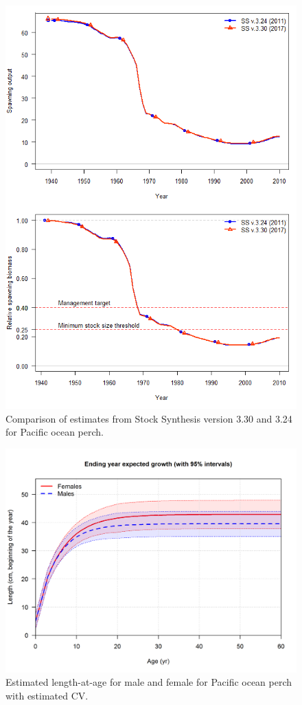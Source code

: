 \documentclass[12pt,]{article}
\begin{document}
\FloatBarrier 

\begin{figure}
\centering
\includegraphics{Figures/bridging.png}
\caption{Comparison of estimates from Stock Synthesis version 3.30 and
3.24 for Pacific ocean perch. \label{fig:bridge}}
\end{figure}

\FloatBarrier 

\begin{figure}
\centering
\includegraphics{r4ss/plots_mod1/bio1_sizeatage.png}
\caption{Estimated length-at-age for male and female for Pacific ocean
perch with estimated CV. \label{fig:sizeatage}}
\end{figure}
\end{document}
